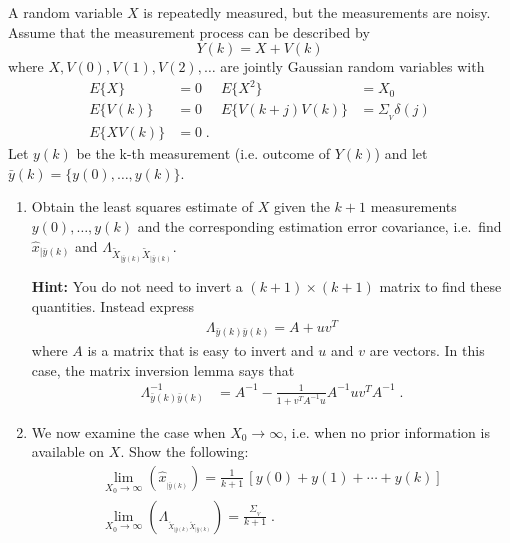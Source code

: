 \item
A random variable $X$ is repeatedly measured, but the measurements are noisy.  Assume that the measurement process can be described by
\begin{equation*}
    Y(k) = X + V(k)
\end{equation*}
where $X, V(0), V(1), V(2), \ldots$ are jointly Gaussian random variables with
\begin{align*}
    E \{ X \} & = 0
        & E \{ X^2 \} & = X_0 \\
    E \{ V(k) \} & = 0
        & E \{ V(k+j) V(k) \} & = \Sigma_{_{V}} \delta(j) \\
    E \{ X V(k) \} & = 0 \; .
\end{align*}
Let $y(k)$ be the k-th measurement (i.e. outcome of $Y(k)$) and let $\bar{y}(k) = \{ y(0),\ldots,y(k) \}$.

\begin{enumerate}

\item
Obtain the least squares estimate of $X$ given the $k+1$ measurements $y(0), \ldots, y(k)$ and the corresponding estimation error covariance, i.e.\ find $\hat{x}_{|\bar{y}(k)}$ and $\Lambda_{\tilde{X}_{|\bar{y}(k)} \tilde{X}_{|\bar{y}(k)}}$.

\textbf{Hint:} You do not need to invert a $(k+1) \times (k+1)$ matrix to find these quantities. Instead express
\begin{align*}
    \Lambda_{\bar{y}(k) \bar{y}(k)} = A + uv^T
\end{align*}
where $A$ is a matrix that is easy to invert and $u$ and $v$ are vectors. In this case, the matrix inversion lemma says that
\begin{align*}
    \Lambda_{\bar{y}(k) \bar{y}(k)}^{-1} %
    & = A^{-1} - \frac{1}{1+v^T A^{-1} u} A^{-1} u v^T A^{-1} \; .
\end{align*}

\item
We now examine the case when $X_0  \to \infty$, i.e. when no prior information is available on $X$. Show the following:
\begin{gather*}
    \lim_{X_0  \to \infty} \left( \hat{x}_{_{|\bar{y}(k)}} \right)
        = \frac{1}{k+1}\, [ y(0) + y(1) + \cdots + y(k) ] \\
    \lim_{X_0  \to \infty} \left( \Lambda_{_{\tilde{X}_{|\bar{y}(k)} \tilde{X}_{|\bar{y}(k)}}} \right)
        = \frac{\Sigma_{_V}}{k+1} \; .
\end{gather*}

\end{enumerate}


